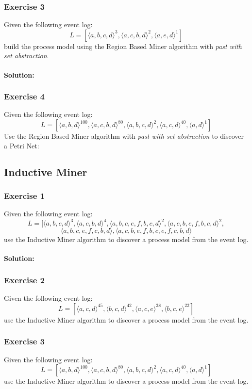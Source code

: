 \subsubsection{Exercise 3}
Given the following event log:
\[L = [\langle a,b,c,d \rangle^3, \langle a,c,b,d \rangle^2, \langle a,e,d \rangle^1]\] 
build the process model using the Region Based Miner algorithm with \textit{past with set abstraction}.
\paragraph{Solution:}

\subsubsection{Exercise 4}
Given the following event log:
\[L = [\langle a,b,d \rangle^{100}, \langle a,c,b,d \rangle^{80}, \langle a,b,c,d \rangle^{2}, \langle a,c,d \rangle^{40}, \langle a,d \rangle^{1}]\]
Use the Region Based Miner algorithm with \textit{past with set abstraction} to discover a Petri Net:

\subsection{Inductive Miner}
\subsubsection{Exercise 1}
Given the following event log:
\[L = [\langle a,b,c,d \rangle^3,
    \langle a,c,b,d \rangle^4,
    \langle a,b,c,e,f,b,c,d \rangle^2,
    \langle a,c,b,e,f,b,c,d \rangle^2,\]
\[
    \langle a,b,c,e,f,c,b,d \rangle,
    \langle a,c,b,e,f,b,c,e,f,c,b,d \rangle 
\]
use the Inductive Miner algorithm to discover a process model from the event log.
\paragraph{Solution:}

\subsubsection{Exercise 2}
Given the following event log:
\[L = [\langle a,c,d \rangle^{45}, \langle b,c,d \rangle^{42}, \langle a,c,e \rangle^{38}, \langle b,c,e \rangle^{22}]\]
use the Inductive Miner algorithm to discover a process model from the event log.

\subsubsection{Exercise 3}
Given the following event log:
\[L = [\langle a,b,d \rangle^{100}, \langle a,c,b,d \rangle^{80}, \langle a,b,c,d \rangle^{2}, \langle a,c,d \rangle^{40}, \langle a,d \rangle^{1}]\]
use the Inductive Miner algorithm to discover a process model from the event log.